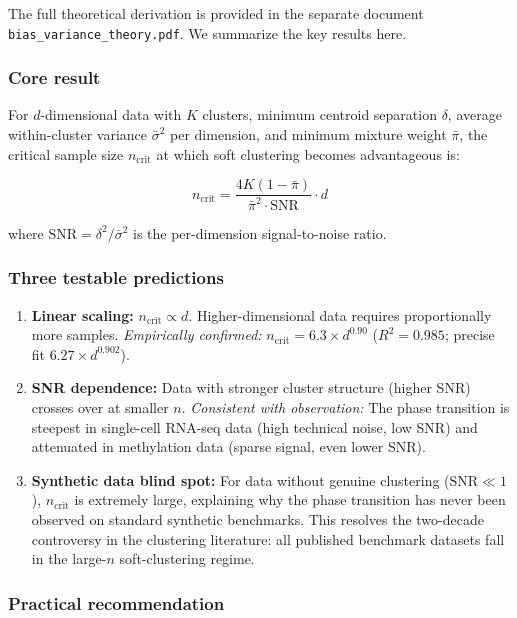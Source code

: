 \documentclass[12pt,a4paper]{article}
\begin{document}
The full theoretical derivation is provided in the separate document
\texttt{bias\_variance\_theory.pdf}. We summarize the key results here.

\subsubsection*{Core result}

For $d$-dimensional data with $K$ clusters, minimum centroid separation
$\delta$, average within-cluster variance $\bar{\sigma}^2$ per dimension,
and minimum mixture weight $\bar{\pi}$, the critical sample size $n_{\text{crit}}$
at which soft clustering becomes advantageous is:

\[
\boxed{n_{\text{crit}} = \frac{4K(1 - \bar{\pi})}{\bar{\pi}^2 \cdot \text{SNR}} \cdot d}
\]

where $\text{SNR} = \delta^2 / \bar{\sigma}^2$ is the per-dimension
signal-to-noise ratio.

\subsubsection*{Three testable predictions}

\begin{enumerate}
\item \textbf{Linear scaling:} $n_{\text{crit}} \propto d$. Higher-dimensional
data requires proportionally more samples. \textit{Empirically confirmed:}
$n_{\text{crit}} = 6.3 \times d^{0.90}$ ($R^2 = 0.985$; precise fit $6.27 \times d^{0.902}$).

\item \textbf{SNR dependence:} Data with stronger cluster structure (higher SNR)
crosses over at smaller $n$. \textit{Consistent with observation:} The phase
transition is steepest in single-cell RNA-seq data (high technical noise,
low SNR) and attenuated in methylation data (sparse signal, even lower SNR).

\item \textbf{Synthetic data blind spot:} For data without genuine clustering
($\text{SNR} \ll 1$), $n_{\text{crit}}$ is extremely large, explaining why the
phase transition has never been observed on standard synthetic benchmarks.
This resolves the two-decade controversy in the clustering literature: all
published benchmark datasets fall in the large-$n$ soft-clustering regime.
\end{enumerate}

\subsubsection*{Practical recommendation}
\end{document}
